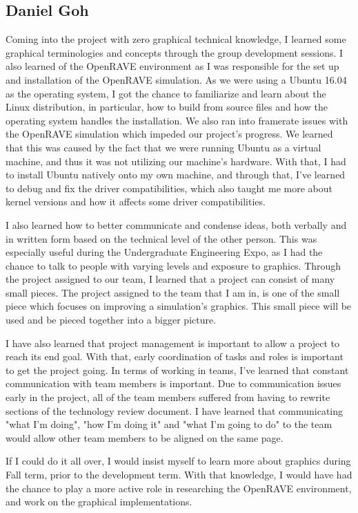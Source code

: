 \documentclass[10pt,journal,compsoc,draftclsnofoot]{IEEEtran}
\begin{document}
\begin{flushleft}
\subsection{Daniel Goh}
Coming into the project with zero graphical technical knowledge, I learned some graphical terminologies and concepts through the group development sessions.
I also learned of the OpenRAVE environment as I was responsible for the set up and installation of the OpenRAVE simulation.
As we were using a Ubuntu 16.04 as the operating system, I got the chance to familiarize and learn about the Linux distribution, in particular, how to build from source files and how the operating system handles the installation.
We also ran into framerate issues with the OpenRAVE simulation which impeded our project's progress.
We learned that this was caused by the fact that we were running Ubuntu as a virtual machine, and thus it was not utilizing our machine's hardware.
With that, I had to install Ubuntu natively onto my own machine, and through that, I've learned to debug and fix the driver compatibilities, which also taught me more about kernel versions and how it affects some driver compatibilities.  
\par
\vspace{3mm}
I also learned how to better communicate and condense ideas, both verbally and in written form based on the technical level of the other person.
This was especially useful during the Undergraduate Engineering Expo, as I had the chance to talk to people with varying levels and exposure to graphics.
Through the project assigned to our team, I learned that a project can consist of many small pieces.
The project assigned to the team that I am in, is one of the small piece which focuses on improving a simulation's graphics.
This small piece will be used and be pieced together into a bigger picture.
\par
\vspace{3mm}
I have also learned that project management is important to allow a project to reach its end goal.
With that, early coordination of tasks and roles is important to get the project going.
In terms of working in teams, I've learned that constant communication with team members is important.
Due to communication issues early in the project, all of the team members suffered from having to rewrite sections of the technology review document.
I have learned that communicating "what I'm doing", "how I'm doing it" and "what I'm going to do" to the team would allow other team members to be aligned on the same page.
\par
\vspace{3mm}
If I could do it all over, I would insist myself to learn more about graphics during Fall term, prior to the development term.
With that knowledge, I would have had the chance to play a more active role in researching the OpenRAVE environment, and work on the graphical implementations.


\end{flushleft}
\end{document}
